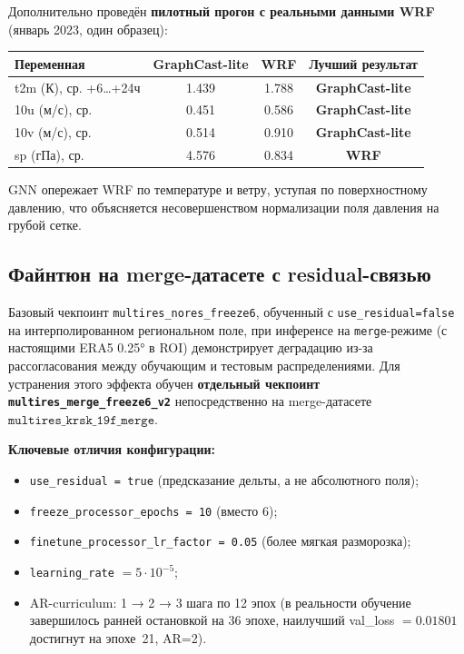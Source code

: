 \documentclass[14pt,a4paper]{extarticle}
\newcounter{none}
\numberwithin{table}{section}
\numberwithin{figure}{section}
\numberwithin{equation}{section}
\providecommand{\tightlist}{%
  \setlength{\itemsep}{0pt}\setlength{\parskip}{0pt}}
\begin{document}
Дополнительно проведён \textbf{пилотный прогон с реальными данными WRF}
(январь 2023, один образец):

{\def\LTcaptype{none} %
\begin{longtable}[]{@{}lccc@{}}
\toprule\noalign{}
Переменная & GraphCast-lite & WRF & Лучший результат \\
\midrule\noalign{}
\endhead
\bottomrule\noalign{}
\endlastfoot
t2m (К), ср. +6\ldots+24ч & 1.439 & 1.788 & \textbf{GraphCast-lite} \\
10u (м/с), ср. & 0.451 & 0.586 & \textbf{GraphCast-lite} \\
10v (м/с), ср. & 0.514 & 0.910 & \textbf{GraphCast-lite} \\
sp (гПа), ср. & 4.576 & 0.834 & \textbf{WRF} \\
\end{longtable}
}

GNN опережает WRF по температуре и ветру, уступая по поверхностному
давлению, что объясняется несовершенством нормализации поля давления на
грубой сетке.

\subsection{Файнтюн на merge-датасете с residual-связью}\label{ux444ux430ux439ux43dux442ux44eux43d-ux43dux430-merge-ux434ux430ux442ux430ux441ux435ux442ux435}

Базовый чекпоинт \texttt{multires\_nores\_freeze6}, обученный с
\texttt{use\_residual=false} на интерполированном
региональном поле, при инференсе на \texttt{merge}-режиме (с настоящими
ERA5 0.25° в ROI) демонстрирует деградацию из-за рассогласования между
обучающим и тестовым распределениями. Для устранения этого эффекта
обучен \textbf{отдельный чекпоинт \texttt{multires\_merge\_freeze6\_v2}}
непосредственно на merge-датасете \(\texttt{multires\_krsk\_19f\_merge}\).

\textbf{Ключевые отличия конфигурации:}

\begin{itemize}
\tightlist
\item
  \texttt{use\_residual = true} (предсказание дельты, а не абсолютного
  поля);
\item
  \texttt{freeze\_processor\_epochs = 10} (вместо 6);
\item
  \texttt{finetune\_processor\_lr\_factor = 0.05} (более мягкая
  разморозка);
\item
  \texttt{learning\_rate} \(= 5 \cdot 10^{-5}\);
\item
  AR-curriculum: 1 → 2 → 3 шага по 12 эпох (в реальности обучение
  завершилось ранней остановкой на 36 эпохе, наилучший val\_loss
  \(=0.01801\) достигнут на эпохе~21, AR=2).
\end{itemize}
\end{document}
